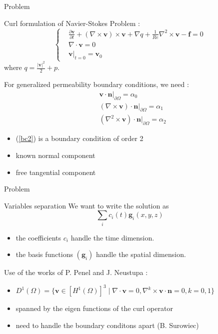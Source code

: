 \documentclass{beamer}
\newcommand{\grad}{{\nabla}}
\newcommand{\curl}{{\nabla\times}}
\newcommand{\curll}{{\nabla^2\times}}
\renewcommand{\div}{{\nabla\cdot}}
\newcommand{\restr}{{\big\rvert_{\partial\Omega}}}
\begin{document}
\begin{frame}{Problem}
  \begin{block}{Curl formulation of Navier-Stokes Problem :}
    \begin{equation}
      \label{start}
      \left\{\begin{aligned}
      &\frac{\partial \mathbf{v}}{\partial t} + (\curl  \mathbf{v})\times \mathbf{v} + \grad q + \frac{1}{Re}\curll  \mathbf{v}-\mathbf{f} = 0\\
      &\div \mathbf{v} = 0\\
      &\mathbf{v}\big\rvert_{t=0} = \mathbf{v}_0
      \end{aligned}\right.
    \end{equation}
    where $q = \frac{|\mathbf{v}|^2}{2}+p$.
  \end{block}
  For generalized permeability boundary conditions, we need :
  \begin{align}
    &\mathbf{v}\cdot \mathbf{n}\restr = \alpha_0 \label{bc0}\\
    &(\curl  \mathbf{v})\cdot \mathbf{n}\restr = \alpha_1 \label{bc1}\\
    &(\curll  \mathbf{v})\cdot \mathbf{n}\restr = \alpha_2 \label{bc2}
  \end{align}
  \begin{itemize}
  \item (\ref{bc2}) is a boundary condition of order 2
  \item known normal component
  \item free tangential component
  \end{itemize}
\end{frame}

\begin{frame}{Problem}
  \begin{block}{Variables separation}
    We want to write the solution as
    \[ \sum_i c_i(t) \mathbf{g}_i(x,y,z) \]
    \begin{itemize}
    \item the coefficients $c_i$ handle the time dimension.
    \item the basis functions $(\mathbf{g}_i)$ handle the spatial dimension.
    \end{itemize}
  \end{block}
  Use of the works of P. Penel and J. Neustupa \cite{Penel2004} :
  \begin{itemize}
  \item $D^1(\Omega) = \{\mathbf{v} \in [H^1(\Omega)]^3\; |\; \div\mathbf{v}=0,\nabla^k\times \mathbf{v}\cdot \mathbf{n} = 0, k=0,1 \}$
  \item spanned by the eigen functions of the curl operator
  \item need to handle the boundary conditons apart (B. Surowiec)
  \end{itemize}
\end{frame}
\end{document}
